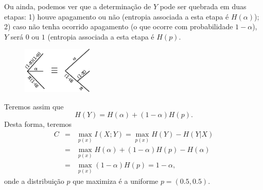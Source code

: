 \begin{frame}[allowframebreaks]
\begin{exercise}
  \exercisebreak

  Ou ainda, podemos ver que a determinação de $Y$ pode ser quebrada em duas etapas: 1) houve apagamento ou não 
  (entropia associada a esta etapa é $H(\alpha)$);
  2) caso não tenha ocorrido apagamento (o que ocorre com probabilidade $1-\alpha$), $Y$ será $0$ ou $1$ 
  (entropia associada a esta etapa é $H(p)$.

     \begin{figure}[h!]
     \centering
     \includegraphics[width=0.3\textwidth]{images/eqvh.pdf}
     \label{fig:eqvh2}
     \end{figure}

  \exercisebreak
  Teremos assim que
  \begin{equation}
  H(Y) = H(\alpha) + (1-\alpha) H(p).
  \end{equation}
  Desta forma, teremos
  \begin{eqnarray}
  C &=& \max_{p(x)} I(X;Y) = \max_{p(x)} H(Y) - H(Y|X) \nonumber \\
	&=& \max_{p(x)} H(\alpha) + (1-\alpha) H(p) - H(\alpha) \nonumber \\
	&=& \max_{p(x)} (1-\alpha) H(p) = 1-\alpha ,
  \end{eqnarray}
  onde a distribuição $p$ que maximiza é a uniforme $p = (0.5, 0.5)$.

  \end{exercise}
\end{frame}



